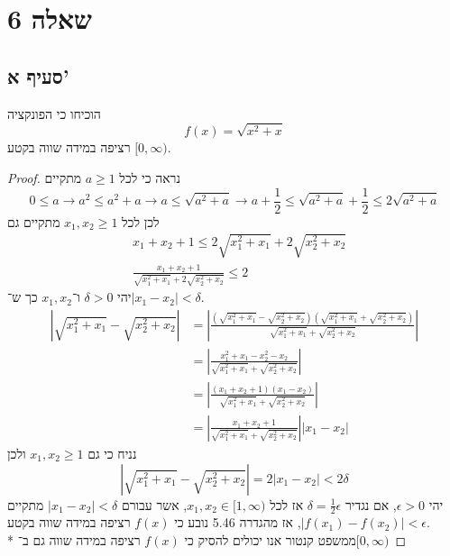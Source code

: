 \section{שאלה 6}
\subsection{סעיף א'}
הוכיחו כי הפונקציה
\[
	f(x) = \sqrt{x^2 + x}
\]
רציפה במידה שווה בקטע $[0, \infty)$. %
\begin{proof}
	נראה כי לכל $a \ge 1$ מתקיים
	\[
		0 \le a
		\rightarrow a^2 \le a^2 + a
		\rightarrow a \le \sqrt{a^2 + a}
		\rightarrow a + \frac{1}{2} \le \sqrt{a^2 + a} + \frac{1}{2} \le 2 \sqrt{a^2 + a}
	\]
	לכן לכל $x_1, x_2 \ge 1$ מתקיים גם
	\begin{align*}
		& x_1 + x_2 + 1 \le 2 \sqrt{x_1^2 + x_1} + 2 \sqrt{x_2^2 + x_2} \\
		& \frac{x_1 + x_2 + 1}{ \sqrt{x_1^2 + x_1} + 2 \sqrt{x_2^2 + x_2}} \le 2
	\end{align*}
	יהי $\delta > 0$ ו־$x_1, x_2$ כך ש־$|x_1 - x_2| < \delta$.
	\begin{align*}
		\left\lvert \sqrt{x_1^2 + x_1} - \sqrt{x_2^2 + x_2} \right\rvert
		& = \left\lvert \frac{\left( \sqrt{x_1^2 + x_1} - \sqrt{x_2^2 + x_2} \right)\left( \sqrt{x_1^2 + x_1} + \sqrt{x_2^2 + x_2} \right)}
			{\sqrt{x_1^2 + x_1} + \sqrt{x_2^2 + x_2}} \right\rvert \\
		& = \left\lvert \frac{ x_1^2 + x_1 - x_2^2 - x_2 }{\sqrt{x_1^2 + x_1} + \sqrt{x_2^2 + x_2}} \right\rvert \\
		& = \left\lvert \frac{ (x_1 + x_2 + 1)(x_1 - x_2) }{\sqrt{x_1^2 + x_1} + \sqrt{x_2^2 + x_2}} \right\rvert \\
		& = \left\lvert \frac{ x_1 + x_2 + 1 }{\sqrt{x_1^2 + x_1} + \sqrt{x_2^2 + x_2}} \right\rvert |x_1 - x_2|
	\end{align*}
	נניח כי גם $x_1, x_2 \ge 1$ ולכן
	\[
		\left\lvert \sqrt{x_1^2 + x_1} - \sqrt{x_2^2 + x_2} \right\rvert = 2 |x_1 - x_2| < 2 \delta
	\]
	יהי $\epsilon > 0$, אם נגדיר $\delta = \frac{1}{2} \epsilon$ אז לכל $x_1, x_2 \in [1, \infty)$, %
	אשר עבורם $|x_1 - x_2| < \delta$ מתקיים $|f(x_1) - f(x_2)| < \epsilon$,
	אז מהגדרה 5.46 נובע כי $f(x)$ רציפה במידה שווה בקטע. \\*
	ממשפט קנטור אנו יכולים להסיק כי $f(x)$ רציפה במידה שווה גם ב־$[0, \infty)$ %
\end{proof}

